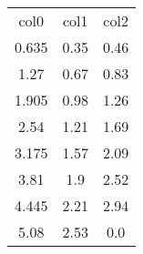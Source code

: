 \begin{table}
\begin{tabular}{ccc}
col0 & col1 & col2 \\
0.635 & 0.35 & 0.46 \\
1.27 & 0.67 & 0.83 \\
1.905 & 0.98 & 1.26 \\
2.54 & 1.21 & 1.69 \\
3.175 & 1.57 & 2.09 \\
3.81 & 1.9 & 2.52 \\
4.445 & 2.21 & 2.94 \\
5.08 & 2.53 & 0.0 \\
\end{tabular}
\end{table}
